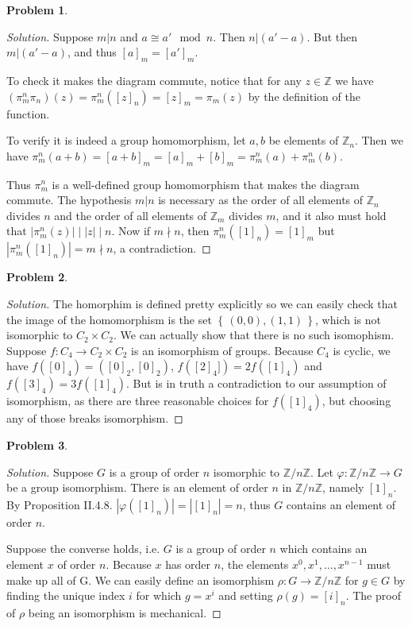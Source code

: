 \documentclass{article}
\theoremstyle{definition}
\newtheorem{problem-internal}{Problem}[subsection]
\newenvironment{problem}{
	\medskip
	\begin{problem-internal}
	}{
\end{problem-internal}
}
\newenvironment{solution}{
	\begin{proof}[Solution]
		\vspace{-8px}
		\setlength{\parskip}{4px}
		\setlength{\parindent}{0px}
	}{
\end{proof}
}
\newcommand{\set}[1]{\left\{\,#1\,\right\}}
\newcommand{\abs}[1]{\left|#1\right|}
\newcommand{\Z}[1]{\mathbb{Z}/#1\mathbb{Z}}
\begin{document}
\begin{problem}
\end{problem}

\begin{solution}
	Suppose $m | n$ and $a \cong a' \mod n$. Then $n | (a' - a)$. But then $m | (a' - a)$, and thus $[a]_m = [a']_m$.
	
	To check it makes the diagram commute, notice that for any $z \in \mathbb{Z}$ we have $(\pi^n_m \pi_n)(z)=\pi^n_m([z]_n)=[z]_m=\pi_m(z)$ by the definition of the function.
	
	To verify it is indeed a group homomorphism, let $a,b$ be elements of $\mathbb{Z}_n$. Then we have $\pi^n_m(a+b)=[a+b]_m=[a]_m + [b]_m = \pi^n_m(a) + \pi^n_m(b)$.
	
	Thus $\pi^n_m$ is a well-defined group homomorphism that makes the diagram commute. The hypothesis $m | n$ is necessary as the order of all elements of $\mathbb{Z}_n$ divides $n$ and the order of all elements of $\mathbb{Z}_m$ divides $m$, and it also must hold that $\abs{\pi^n_m(z)} \mid \abs{z} \mid n$. Now if $m \nmid n$, then $\pi^n_m([1]_n)=[1]_m$ but $\abs{\pi^n_m([1]_n)}=m \nmid n$, a contradiction.
\end{solution}

\begin{problem}
\end{problem}

\begin{solution}
	The homorphim is defined pretty explicitly so we can easily check that the image of the homomorphism is the set $\set{(0,0),(1,1)}$, which is not isomorphic to $C_2 \times C_2$. We can actually show that there is no such isomophism. Suppose $f: C_4 \to C_2 \times C_2$ is an isomorphism of groups. Because $C_4$ is cyclic, we have $f([0]_4)=([0]_2,[0]_2)$, $f([2]_4])=2f([1]_4)$ and $f([3]_4)=3f([1]_4)$. But is in truth a contradiction to our assumption of isomorphism, as there are three reasonable choices for $f([1]_4)$, but choosing any of those breaks isomorphism.
\end{solution}

\begin{problem}
\end{problem}

\begin{solution}
	Suppose $G$ is a group of order $n$ isomorphic to $\mathbb{Z}/n\mathbb{Z}$. Let $\varphi: \Z{n} \to G$ be a group isomorphism. There is an element of order $n$ in $\Z{n}$, namely $[1]_n$. By Proposition II.4.8. $\abs{\varphi([1]_n)}=\abs{[1]_n}=n$, thus $G$ contains an element of order $n$.
	
	Suppose the converse holds, i.e. $G$ is a group of order $n$ which contains an element $x$ of 
	order $n$. Because $x$ has order $n$, the elements $x^0, x^1, \dots, x^{n-1}$ must make up all of 
	G. We can easily define an isomorphism $\rho: G \to \Z{n}$ for $g \in G$ by finding the unique index 
	$i$ for which $g = x^i$ and setting $\rho(g) = [i]_n$. The proof of $\rho$ being an isomorphism is 
	mechanical.
\end{solution}
\end{document}
